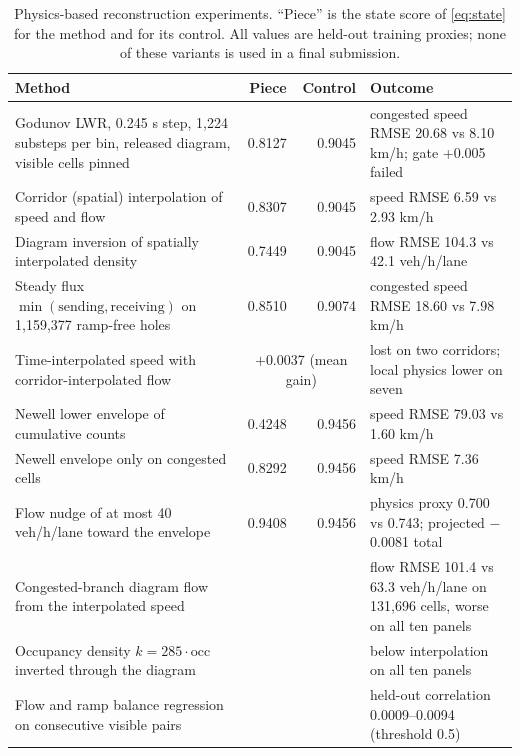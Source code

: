 \begin{table}[h]
\centering\small
\caption{Physics-based reconstruction experiments. ``Piece'' is the state score of \cref{eq:state} for the method and
for its control. All values are held-out training proxies; none of these variants is used in a final
submission.}\label{tab:physics}
\begin{tabularx}{\linewidth}{@{}X r r X@{}}
\toprule
Method & Piece & Control & Outcome \\
\midrule
Godunov LWR, 0.245 s step, 1,224 substeps per bin, released diagram, visible cells pinned \cite{godunov1959,daganzo1994} & 0.8127 & 0.9045 & congested speed RMSE 20.68 vs 8.10 km/h; gate +0.005 failed \\
Corridor (spatial) interpolation of speed and flow & 0.8307 & 0.9045 & speed RMSE 6.59 vs 2.93 km/h \\
Diagram inversion of spatially interpolated density & 0.7449 & 0.9045 & flow RMSE 104.3 vs 42.1 veh/h/lane \\
Steady flux $\min(\text{sending},\text{receiving})$ on 1,159,377 ramp-free holes & 0.8510 & 0.9074 & congested speed RMSE 18.60 vs 7.98 km/h \\
Time-interpolated speed with corridor-interpolated flow & \multicolumn{2}{c}{$+$0.0037 (mean gain)} & lost on two corridors; local physics lower on seven \\
Newell lower envelope of cumulative counts \cite{newell1993} & 0.4248 & 0.9456 & speed RMSE 79.03 vs 1.60 km/h \\
Newell envelope only on congested cells & 0.8292 & 0.9456 & speed RMSE 7.36 km/h \\
Flow nudge of at most 40 veh/h/lane toward the envelope & 0.9408 & 0.9456 & physics proxy 0.700 vs 0.743; projected $-$0.0081 total \\
Congested-branch diagram flow from the interpolated speed & & & flow RMSE 101.4 vs 63.3 veh/h/lane on 131,696 cells, worse on all ten panels \\
Occupancy density $k=285\cdot\mathrm{occ}$ inverted through the diagram & & & below interpolation on all ten panels \\
Flow and ramp balance regression on consecutive visible pairs & & & held-out correlation 0.0009--0.0094 (threshold 0.5) \\
\bottomrule
\end{tabularx}
\end{table}

